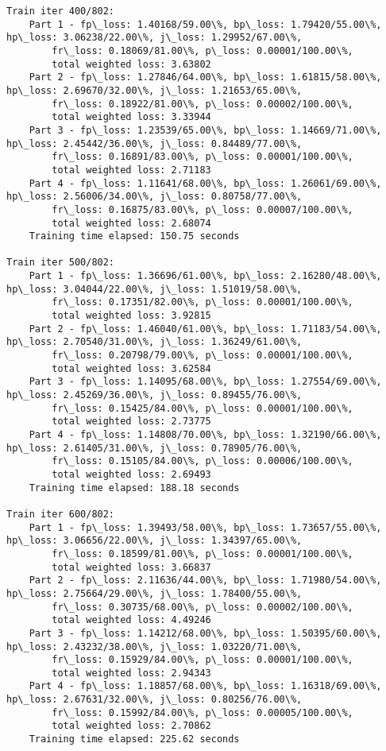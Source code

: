 \documentclass[11pt]{article}
\begin{document}
\begin{Verbatim}[commandchars=\\\{\}]
Train iter 400/802:
	Part 1 - fp\_loss: 1.40168/59.00\%, bp\_loss: 1.79420/55.00\%, hp\_loss: 3.06238/22.00\%, j\_loss: 1.29952/67.00\%, 
		fr\_loss: 0.18069/81.00\%, p\_loss: 0.00001/100.00\%, 
		total weighted loss: 3.63802
	Part 2 - fp\_loss: 1.27846/64.00\%, bp\_loss: 1.61815/58.00\%, hp\_loss: 2.69670/32.00\%, j\_loss: 1.21653/65.00\%, 
		fr\_loss: 0.18922/81.00\%, p\_loss: 0.00002/100.00\%, 
		total weighted loss: 3.33944
	Part 3 - fp\_loss: 1.23539/65.00\%, bp\_loss: 1.14669/71.00\%, hp\_loss: 2.45442/36.00\%, j\_loss: 0.84489/77.00\%, 
		fr\_loss: 0.16891/83.00\%, p\_loss: 0.00001/100.00\%, 
		total weighted loss: 2.71183
	Part 4 - fp\_loss: 1.11641/68.00\%, bp\_loss: 1.26061/69.00\%, hp\_loss: 2.56006/34.00\%, j\_loss: 0.80758/77.00\%, 
		fr\_loss: 0.16875/83.00\%, p\_loss: 0.00007/100.00\%, 
		total weighted loss: 2.68074
	Training time elapsed: 150.75 seconds

Train iter 500/802:
	Part 1 - fp\_loss: 1.36696/61.00\%, bp\_loss: 2.16280/48.00\%, hp\_loss: 3.04044/22.00\%, j\_loss: 1.51019/58.00\%, 
		fr\_loss: 0.17351/82.00\%, p\_loss: 0.00001/100.00\%, 
		total weighted loss: 3.92815
	Part 2 - fp\_loss: 1.46040/61.00\%, bp\_loss: 1.71183/54.00\%, hp\_loss: 2.70540/31.00\%, j\_loss: 1.36249/61.00\%, 
		fr\_loss: 0.20798/79.00\%, p\_loss: 0.00001/100.00\%, 
		total weighted loss: 3.62584
	Part 3 - fp\_loss: 1.14095/68.00\%, bp\_loss: 1.27554/69.00\%, hp\_loss: 2.45269/36.00\%, j\_loss: 0.89455/76.00\%, 
		fr\_loss: 0.15425/84.00\%, p\_loss: 0.00001/100.00\%, 
		total weighted loss: 2.73775
	Part 4 - fp\_loss: 1.14808/70.00\%, bp\_loss: 1.32190/66.00\%, hp\_loss: 2.61405/31.00\%, j\_loss: 0.78905/76.00\%, 
		fr\_loss: 0.15105/84.00\%, p\_loss: 0.00006/100.00\%, 
		total weighted loss: 2.69493
	Training time elapsed: 188.18 seconds

Train iter 600/802:
	Part 1 - fp\_loss: 1.39493/58.00\%, bp\_loss: 1.73657/55.00\%, hp\_loss: 3.06656/22.00\%, j\_loss: 1.34397/65.00\%, 
		fr\_loss: 0.18599/81.00\%, p\_loss: 0.00001/100.00\%, 
		total weighted loss: 3.66837
	Part 2 - fp\_loss: 2.11636/44.00\%, bp\_loss: 1.71980/54.00\%, hp\_loss: 2.75664/29.00\%, j\_loss: 1.78400/55.00\%, 
		fr\_loss: 0.30735/68.00\%, p\_loss: 0.00002/100.00\%, 
		total weighted loss: 4.49246
	Part 3 - fp\_loss: 1.14212/68.00\%, bp\_loss: 1.50395/60.00\%, hp\_loss: 2.43232/38.00\%, j\_loss: 1.03220/71.00\%, 
		fr\_loss: 0.15929/84.00\%, p\_loss: 0.00001/100.00\%, 
		total weighted loss: 2.94343
	Part 4 - fp\_loss: 1.18857/68.00\%, bp\_loss: 1.16318/69.00\%, hp\_loss: 2.67631/32.00\%, j\_loss: 0.80256/76.00\%, 
		fr\_loss: 0.15992/84.00\%, p\_loss: 0.00005/100.00\%, 
		total weighted loss: 2.70862
	Training time elapsed: 225.62 seconds


\end{Verbatim}
\end{document}
